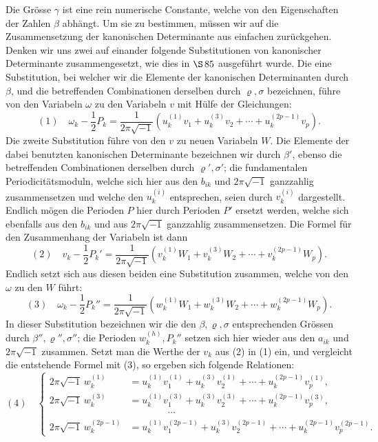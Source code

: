 \documentclass[10pt]{article}
\begin{document}
Die Grösse \(\gamma\) ist eine rein numerische Constante, welche von den Eigenschaften der Zahlen \(\beta\) abhängt. Um sie zu bestimmen, müssen wir auf die Zusammensetzung der kanonischen Determinante aus einfachen zurückgehen. Denken wir uns zwei auf einander folgende Substitutionen von kanonischer Determinante zusammengesetzt, wie dies in \(\S\,85\) ausgeführt wurde. Die eine Substitution, bei welcher wir die Elemente der kanonischen Determinanten durch \(\beta\), und die betreffenden Combinationen derselben durch \(\varrho,\sigma\) bezeichnen, führe von den Variabeln \(\omega\) zu den Variabeln \(v\) mit Hülfe der Gleichungen:
\[
(1)\quad
\omega_k-\frac12P_k
=\frac{1}{2\pi\sqrt{-1}}\left(u_k^{(1)}v_1+u_k^{(3)}v_2+\cdots+u_k^{(2p-1)}v_p\right).
\]
Die zweite Substitution führe von den \(v\) zu neuen Variabeln \(W\). Die Elemente der dabei benutzten kanonischen Determinante bezeichnen wir durch \(\beta'\), ebenso die betreffenden Combinationen derselben durch \(\varrho',\sigma'\); die fundamentalen Periodicitätsmoduln, welche sich hier aus den \(b_{ik}\) und \(2\pi\sqrt{-1}\) ganzzahlig zusammensetzen und welche den \(u_k^{(i)}\) entsprechen, seien durch \(v_k^{(i)}\) dargestellt. Endlich mögen die Perioden \(P\) hier durch Perioden \(P'\) ersetzt werden, welche sich ebenfalls aus den \(b_{ik}\) und aus \(2\pi\sqrt{-1}\) ganzzahlig zusammensetzen. Die Formel für den Zusammenhang der Variabeln ist dann
\[
(2)\quad
v_k-\frac12P_k'
=\frac{1}{2\pi\sqrt{-1}}\left(v_k^{(1)}W_1+v_k^{(3)}W_2+\cdots+v_k^{(2p-1)}W_p\right).
\]
Endlich setzt sich aus diesen beiden eine Substitution zusammen, welche von den \(\omega\) zu den \(W\) führt:
\[
(3)\quad
\omega_k-\frac12P_k''
=\frac{1}{2\pi\sqrt{-1}}\left(w_k^{(1)}W_1+w_k^{(3)}W_2+\cdots+w_k^{(2p-1)}W_p\right).
\]
In dieser Substitution bezeichnen wir die den \(\beta,\varrho,\sigma\) entsprechenden Grössen durch \(\beta'',\varrho'',\sigma''\); die Perioden \(w_k^{(h)},P_k''\) setzen sich hier wieder aus den \(a_{ik}\) und \(2\pi\sqrt{-1}\) zusammen. Setzt man die Werthe der \(v_k\) aus (2) in (1) ein, und vergleicht die entstehende Formel mit (3), so ergeben sich folgende Relationen:
\[
(4)\quad
\left\{\begin{aligned}
2\pi\sqrt{-1}\,w_k^{(1)}&=u_k^{(1)}v_1^{(1)}+u_k^{(3)}v_2^{(1)}+\cdots+u_k^{(2p-1)}v_p^{(1)},\\
2\pi\sqrt{-1}\,w_k^{(3)}&=u_k^{(1)}v_1^{(3)}+u_k^{(3)}v_2^{(3)}+\cdots+u_k^{(2p-1)}v_p^{(3)},\\
&\hspace{4em}\cdots\\
2\pi\sqrt{-1}\,w_k^{(2p-1)}&=u_k^{(1)}v_1^{(2p-1)}+u_k^{(3)}v_2^{(2p-1)}+\cdots+u_k^{(2p-1)}v_p^{(2p-1)}.
\end{aligned}\right.
\]
\end{document}
